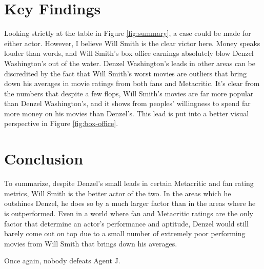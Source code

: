 \documentclass[]{article}
\begin{document}
\newpage

\section{Key Findings}
\label{sec:findings}

Looking strictly at the table in Figure \ref{fig:summary}, a case could
be made for either actor. However, I believe Will Smith is the clear
victor here. Money speaks louder than words, and Will Smith's box office
earnings absolutely blow Denzel Washington's out of the water. Denzel
Washington's leads in other areas can be discredited by the fact that
Will Smith's worst movies are outliers that bring down his averages in
movie ratings from both fans and Metacritic. It's clear from the numbers
that despite a few flops, Will Smith's movies are far more popular than
Denzel Washington's, and it shows from peoples' willingness to spend far
more money on his movies than Denzel's. This lead is put into a better
visual perspective in Figure \ref{fig:box-office}.

\section{Conclusion}
\label{sec:conclusion}

To summarize, despite Denzel's small leads in certain Metacritic and fan
rating metrics, Will Smith is the better actor of the two. In the areas
which he outshines Denzel, he does so by a much larger factor than in
the areas where he is outperformed. Even in a world where fan and
Metacritic ratings are the only factor that determine an actor's
performance and aptitude, Denzel would still barely come out on top due
to a small number of extremely poor performing movies from Will Smith
that brings down his averages.

\vspace{0.5in}

Once again, nobody defeats Agent J. \newpage

\vspace{0.5in}

\newpage






\newpage
\theendnotes

\newpage
\begin{auxmulticols}{1}
\singlespacing 


\end{auxmulticols}

\newpage
{
\hypersetup{linkcolor=black}
\setcounter{tocdepth}{3}
\tableofcontents
}
\end{document}
